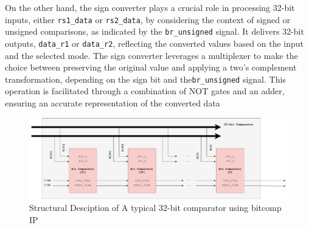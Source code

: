 \documentclass[12pt,a4paper,oneside]{book} %
\begin{document}
On the other hand, the sign converter plays a crucial role in processing 32-bit inputs, either  \texttt{rs1\_data} or  \texttt{rs2\_data}, by considering the context of signed or unsigned comparisons, as indicated by the \texttt{br\_unsigned} signal. It delivers 32-bit outputs, \texttt{data\_r1} or  \texttt{data\_r2}, reflecting the converted values based on the input and the selected mode. The sign converter leverages a multiplexer to make the choice between preserving the original value and applying a two's complement transformation, depending on the sign bit and the\texttt{br\_unsigned} signal. This operation is facilitated through a combination of NOT gates and an adder, ensuring an accurate representation of the converted data
 \begin{figure}[H]
    \centering
    \begin{center}
    \includegraphics[trim=0cm 0cm 0cm 0cm,clip,width=\textwidth]{images/milestone2-regcomp.drawio.pdf}
    \caption{Structural Desciption of A typical 32-bit comparator using bitcomp IP}
    \end{center}
\end{figure}
\end{document}
